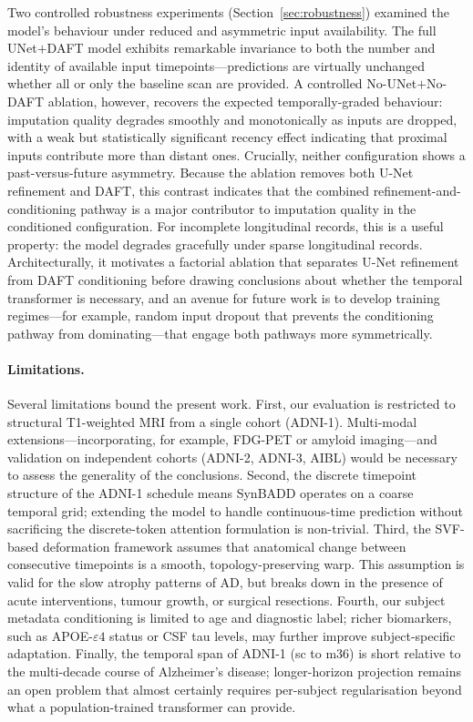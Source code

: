 Two controlled robustness experiments (Section~\ref{sec:robustness}) examined the model's behaviour under reduced and asymmetric input availability. The full UNet$+$DAFT model exhibits remarkable invariance to both the number and identity of available input timepoints---predictions are virtually unchanged whether all or only the baseline scan are provided. A controlled No-UNet$+$No-DAFT ablation, however, recovers the expected temporally-graded behaviour: imputation quality degrades smoothly and monotonically as inputs are dropped, with a weak but statistically significant recency effect indicating that proximal inputs contribute more than distant ones. Crucially, neither configuration shows a past-versus-future asymmetry. Because the ablation removes both U-Net refinement and DAFT, this contrast indicates that the combined refinement-and-conditioning pathway is a major contributor to imputation quality in the conditioned configuration. For incomplete longitudinal records, this is a useful property: the model degrades gracefully under sparse longitudinal records. Architecturally, it motivates a factorial ablation that separates U-Net refinement from DAFT conditioning before drawing conclusions about whether the temporal transformer is necessary, and an avenue for future work is to develop training regimes---for example, random input dropout that prevents the conditioning pathway from dominating---that engage both pathways more symmetrically.

\paragraph{Limitations.} Several limitations bound the present work. First, our evaluation is restricted to structural T1-weighted MRI from a single cohort (ADNI-1). Multi-modal extensions---incorporating, for example, FDG-PET or amyloid imaging---and validation on independent cohorts (ADNI-2, ADNI-3, AIBL) would be necessary to assess the generality of the conclusions. Second, the discrete timepoint structure of the ADNI-1 schedule means SynBADD operates on a coarse temporal grid; extending the model to handle continuous-time prediction without sacrificing the discrete-token attention formulation is non-trivial. Third, the SVF-based deformation framework assumes that anatomical change between consecutive timepoints is a smooth, topology-preserving warp. This assumption is valid for the slow atrophy patterns of AD, but breaks down in the presence of acute interventions, tumour growth, or surgical resections. Fourth, our subject metadata conditioning is limited to age and diagnostic label; richer biomarkers, such as APOE-$\varepsilon 4$ status or CSF tau levels, may further improve subject-specific adaptation. Finally, the temporal span of ADNI-1 (sc to m36) is short relative to the multi-decade course of Alzheimer's disease; longer-horizon projection remains an open problem that almost certainly requires per-subject regularisation beyond what a population-trained transformer can provide.

